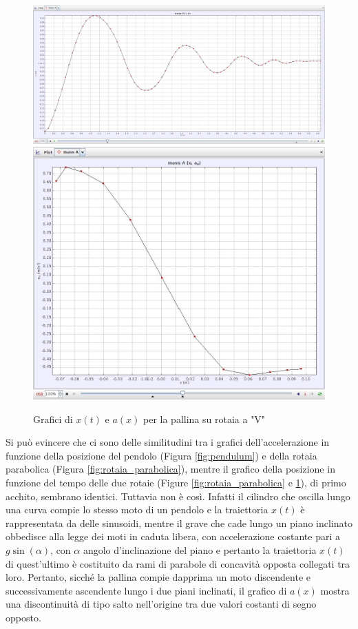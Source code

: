 \documentclass{article}
\begin{document}
\begin{figure}
\centering
  \includegraphics[width=\textwidth]{rotaia_galileo_x_t}
  \includegraphics[width=\textwidth]{rotaia_galileo_a_x}
  \caption{Grafici di $x(t)$ e $a(x)$ per la pallina su rotaia a "V"}
  \label{fig:rotaia_galileo}
\end{figure}

Si può evincere che ci sono delle similitudini tra i grafici dell'accelerazione in
funzione della posizione del pendolo (Figura \ref{fig:pendulum}) e della rotaia parabolica
(Figura \ref{fig:rotaia_parabolica}), mentre il grafico della posizione in funzione
del tempo delle due rotaie (Figure \ref{fig:rotaia_parabolica} e
\ref{fig:rotaia_galileo}), di primo acchito, sembrano identici. Tuttavia non è così.
Infatti il cilindro che oscilla lungo una curva compie lo stesso moto di un pendolo e la traiettoria
$x(t)$ è rappresentata da delle sinusoidi, mentre il grave che cade lungo un piano inclinato obbedisce alla
legge dei moti in caduta libera, con accelerazione costante pari a $g\sin(\alpha)$, con $\alpha$ angolo d'inclinazione del
piano e pertanto la traiettoria $x(t)$ di quest'ultimo è costituito da rami di parabole di concavità opposta
collegati tra loro.
Pertanto, sicché la pallina compie dapprima un moto discendente e successivamente ascendente lungo i due
piani inclinati, il grafico di $a(x)$ mostra una discontinuità di tipo salto nell'origine tra due valori costanti di segno
opposto.
\end{document}
